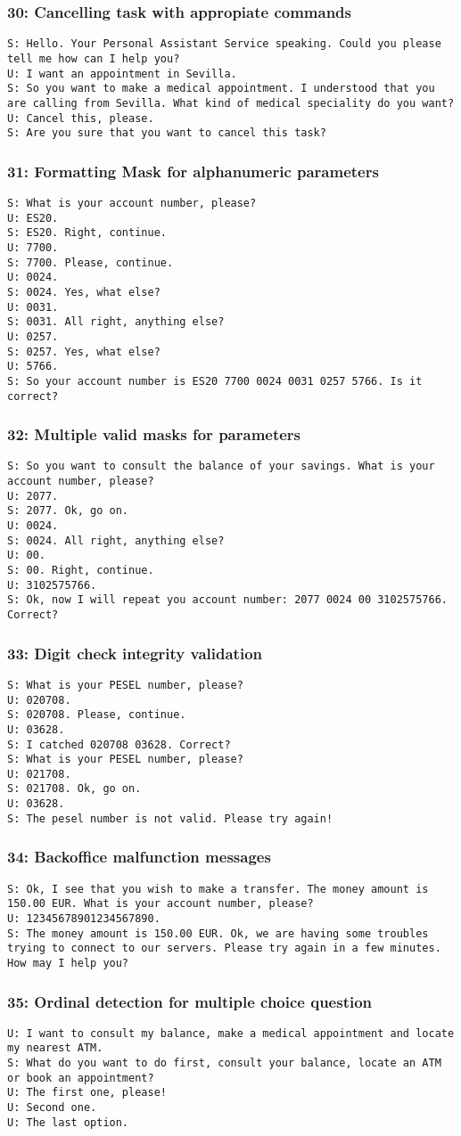 \documentclass[11pt]{beamer}
\newcommand{\system}[1]{{\color{red}\texttt{S: #1}}\\}
\newcommand{\user}[1]{{\color{teal}\texttt{U: #1}}\\}
\begin{document}
\begin{frame}
\frametitle{30: Cancelling task with appropiate commands}
\system{Hello. Your Personal Assistant Service speaking. Could you please tell me how can I help you?}
\user{I want an appointment in Sevilla.}
\system{So you want to make a medical appointment. I understood that you are calling from Sevilla. What kind of medical speciality do you want?}
\user{Cancel this, please.}
\system{Are you sure that you want to cancel this task?}
\end{frame}

\begin{frame}
\frametitle{31: Formatting Mask for alphanumeric parameters}
\system{What is your account number, please?}
\user{ES20.}
\system{ES20. Right, continue.}
\user{7700.}
\system{7700. Please, continue.}
\user{0024.}
\system{0024. Yes, what else?}
\user{0031.}
\system{0031. All right, anything else?}
\user{0257.}
\system{0257. Yes, what else?}
\user{5766.}
\system{So your account number is ES20 7700 0024 0031 0257 5766. Is it correct?}
\end{frame}

\begin{frame}
\frametitle{32: Multiple valid masks for parameters}
\system{So you want to consult the balance of your savings. What is your account number, please?}
\user{2077.}
\system{2077. Ok, go on.}
\user{0024.}
\system{0024. All right, anything else?}
\user{00.}
\system{00. Right, continue.}
\user{3102575766.}
\system{Ok, now I will repeat you account number: 2077 0024 00 3102575766. Correct?}
\end{frame}

\begin{frame}
\frametitle{33: Digit check integrity validation}
\system{What is your PESEL number, please?}
\user{020708.}
\system{020708. Please, continue.}
\user{03628.}
\system{I catched 020708 03628. Correct?}
\vspace{10pt}
\system{What is your PESEL number, please?}
\user{021708.}
\system{021708. Ok, go on.}
\user{03628.}
\system{The pesel number is not valid. Please try again!}
\end{frame}

\begin{frame}
\frametitle{34: Backoffice malfunction messages}
\system{Ok, I see that you wish to make a transfer. The money amount is 150.00 EUR. What is your account number, please?}
\user{12345678901234567890.}
\system{The money amount is 150.00 EUR. Ok, we are having some troubles trying to connect to our servers. Please try again in a few minutes. How may I help you?}
\end{frame}

\begin{frame}
\frametitle{35: Ordinal detection for multiple choice question}
\user{I want to consult my balance, make a medical appointment and locate my nearest ATM.}
\system{What do you want to do first, consult your balance, locate an ATM or book an appointment?} 
\user{The first one, please!} 
\vspace{10pt}
\user{Second one.}
\vspace{10pt}
\user{The last option.}
\end{frame}
\end{document}
